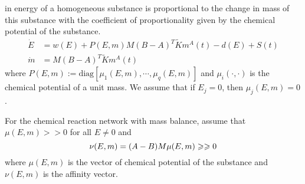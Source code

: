 \documentclass{paper}
\begin{document}
in energy of a homogeneous substance is proportional to the change in mass of this substance with the coefficient of proportionality
given by the chemical potential of the substance.
\begin{align}
\dot{E}&=w(E)+P(E,m)M(B-A)^T\tilde{K}m^A(t)-d(E)+S(t) \\
\dot{m}&=M(B-A)^T\tilde{K}m^A(t)
\end{align}
where $P(E,m):=\text{diag}\left[\mu_1(E,m),\cdots,\mu_q(E,m)\right]$ and $\mu_i(\cdot,\cdot)$ is the chemical potential of a unit mass.
We assume that if $E_j=0$, then $\mu_j(E,m)=0$.
\begin{note}
For the chemical reaction network with mass balance, assume that $\mu(E,m)>>0$ for all $E\neq 0$ and 
\begin{equation}
\nu(E,m)=(A-B)M\mu(E,m)\geqslant\geqslant 0
\end{equation}
where $\mu(E,m)$ is the vector of chemical potential of the substance and $\nu(E,m)$ is the affinity vector.
\end{note}
\end{document}
